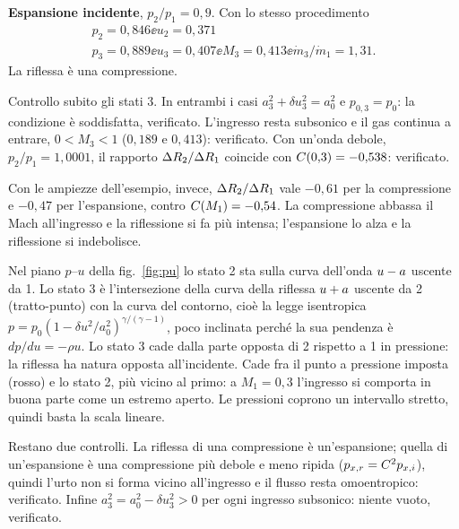 \textbf{Espansione incidente}, $p_2/p_1=0{,}9$. Con lo stesso procedimento
\begin{gather*}
  p_2=0{,}846 \ee u_2=0{,}371 \\
  p_3=0{,}889 \ee u_3=0{,}407 \ee M_3=0{,}413 \ee \dot m_3/\dot m_1=1{,}31 .
\end{gather*}
La riflessa è una compressione.

Controllo subito gli stati 3. In entrambi i casi $a_3^2+\delta u_3^2=a_0^2$ e $p_{0,3}=p_0$: la condizione è
soddisfatta, verificato. L'ingresso resta subsonico e il gas continua a entrare, $0<M_3<1$ ($0{,}189$ e $0{,}413$):
verificato. Con un'onda debole, $p_2/p_1=1{,}0001$, il rapporto $\Delta R_2/\Delta R_1$ coincide con
$C(0{,}3)=-0{,}538$: verificato.

Con le ampiezze dell'esempio, invece, $\Delta R_2/\Delta R_1$ vale $-0{,}61$ per la compressione e $-0{,}47$ per
l'espansione, contro $C(M_1)=-0{,}54$. La compressione abbassa il Mach all'ingresso e la riflessione si fa più
intensa; l'espansione lo alza e la riflessione si indebolisce.


Nel piano $p$--$u$ della fig.~\ref{fig:pu} lo stato 2 sta sulla curva dell'onda $u-a$ uscente da 1. Lo stato 3 è
l'intersezione della curva della riflessa $u+a$ uscente da 2 (tratto-punto) con la curva del contorno, cioè la
legge isentropica $p=p_0(1-\delta u^2/a_0^2)^{\gamma/(\gamma-1)}$, poco inclinata perché la sua pendenza è
$dp/du=-\rho u$. Lo stato 3 cade dalla parte opposta di 2 rispetto a 1 in pressione: la riflessa ha natura opposta
all'incidente. Cade fra il punto a pressione imposta (rosso) e lo stato 2, più vicino al primo: a $M_1=0{,}3$
l'ingresso si comporta in buona parte come un estremo aperto. Le pressioni coprono un intervallo stretto, quindi
basta la scala lineare.

Restano due controlli. La riflessa di una compressione è un'espansione; quella di un'espansione è una compressione
più debole e meno ripida ($p_{x,r}=C^2p_{x,i}$), quindi l'urto non si forma vicino all'ingresso e il flusso resta
omoentropico: verificato. Infine $a_3^2=a_0^2-\delta u_3^2>0$ per ogni ingresso subsonico: niente vuoto,
verificato.

